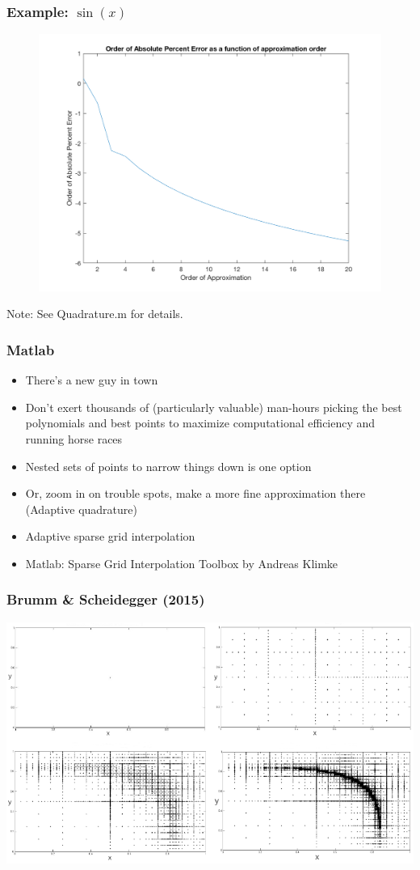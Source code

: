 \documentclass{beamer}
\begin{document}
\begin{frame}
\frametitle[alignment=center]{Example: $\sin(x)$}
\begin{figure}
\centering
\includegraphics[scale=0.5]{Quad_2.png}
\end{figure}
Note: See Quadrature.m for details.
\end{frame}

\begin{frame}
\frametitle[alignment=center]{Matlab}
\begin{itemize}
\item There's a new guy in town
\bigskip
\item Don't exert thousands of (particularly valuable) man-hours picking the best polynomials and best points to maximize computational efficiency and running horse races
\bigskip
\item Nested sets of points to narrow things down is one option
\bigskip
\item Or, zoom in on trouble spots, make a more fine approximation there (Adaptive quadrature)
\bigskip
\item Adaptive sparse grid interpolation
\bigskip
\item Matlab: Sparse Grid Interpolation Toolbox by Andreas Klimke
\end{itemize}
\end{frame}

\begin{frame}
\frametitle[alignment=center]{Brumm \& Scheidegger (2015)}
\includegraphics[scale=0.4]{Brumm_Scheidegger_2015_1.png}
\end{frame}
\end{document}
